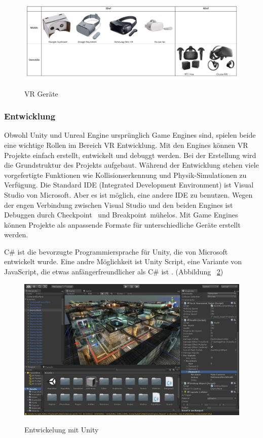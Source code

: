 \begin{figure}[ht]
\vspace*{1em}
\centering
\caption{VR Geräte}
\includegraphics[width=\textwidth]{images/vrDevicesTable.png}
\label{fig:vrDevicesTable} 
\end{figure}
  
  \subsubsection{Entwicklung}
  Obwohl Unity und Unreal Engine ursprünglich Game Engines sind, spielen beide eine wichtige Rollen im Bereich VR Entwicklung. Mit den Engines können VR Projekte einfach erstellt, entwickelt und debuggt werden. Bei der Erstellung wird die Grundstruktur des Projekts aufgebaut. Während der Entwicklung stehen viele vorgefertigte Funktionen wie Kollisionserkennung und Physik-Simulationen zu Verfügung. Die Standard IDE (Integrated Development Environment) ist Visual Studio von Microsoft. Aber es ist möglich, eine andere IDE zu benutzen. Wegen der engen Verbindung zwischen Visual Studio und den beiden Engines ist Debuggen durch \glqq Checkpoint \grqq\ und \glqq Breakpoint\grqq\ mühelos. Mit Game Engines können Projekte als anpassende Formate für unterschiedliche Geräte erstellt werden.

  C\# ist die bevorzugte Programmiersprache für Unity, die von Microsoft entwickelt wurde. Eine andre Möglichkeit ist Unity Script, eine Variante von JavaScript, die etwas anfängerfreundlicher als C\# ist . (Abbildung ~\ref{fig:unity})
  
\begin{figure}[ht]
\vspace*{1em}
\centering
\caption{Entwickelung mit Unity}
\includegraphics[width=\textwidth]{images/unity.jpg}
\label{fig:unity} 
\end{figure}
  
